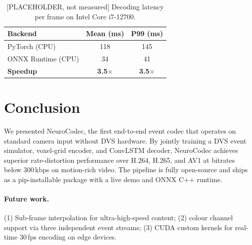 \documentclass[10pt,twocolumn,letterpaper]{article}
\begin{document}
\begin{table}[h]
\centering
\small
\caption{[PLACEHOLDER, not measured] Decoding latency per frame on Intel Core i7-12700.}
\begin{tabular}{@{}lcc@{}}
\toprule
Backend & Mean (ms) & P99 (ms) \\ \midrule
PyTorch (CPU)        & 118 & 145 \\
ONNX Runtime (CPU)   & 34  & 41  \\
\textbf{Speedup}     & \textbf{3.5$\times$} & \textbf{3.5$\times$} \\ \bottomrule
\end{tabular}
\end{table}

\section{Conclusion}
\label{sec:conclusion}

We presented NeuroCodec, the first end-to-end event codec that operates on
standard camera input without DVS hardware.
By jointly training a DVS event simulator, voxel-grid encoder, and ConvLSTM
decoder, NeuroCodec achieves superior rate-distortion performance over H.264,
H.265, and AV1 at bitrates below 300\,kbps on motion-rich video.
The pipeline is fully open-source and ships as a pip-installable package with a
live demo and ONNX C++ runtime.

\paragraph{Future work.}
(1) Sub-frame interpolation for ultra-high-speed content;
(2) colour channel support via three independent event streams;
(3) CUDA custom kernels for real-time 30\,fps encoding on edge devices.
\end{document}
